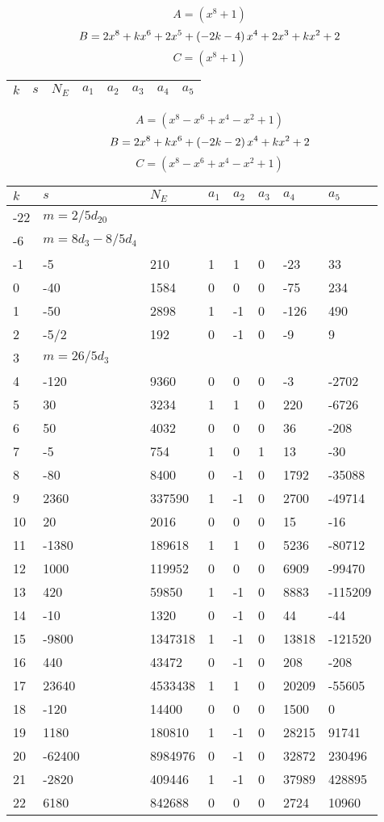 \documentclass{amsart}
\begin{document}
$$A=(x^8
 + 1)$$
$$B=2\*x^8
 + k\*x^6
 + 2\*x^5
 + \left(-2\*k
 - 4\right) \*x^4
 + 2\*x^3
 + k\*x^2
 + 2$$
$$C=(x^8
 + 1)$$
\begin{longtable}{|l|l|l|lllll|}
\hline
$k$ & $s$ & $N_E$ & $a_1$ & $a_2$ & $a_3$ & $a_4$ & $a_5$\\
\hline
\hline
\end{longtable}
$$A=(x^8
 - x^6
 + x^4
 - x^2
 + 1)$$
$$B=2\*x^8
 + k\*x^6
 + \left(-2\*k
 - 2\right) \*x^4
 + k\*x^2
 + 2$$
$$C=(x^8
 - x^6
 + x^4
 - x^2
 + 1)$$
\begin{longtable}{|l|l|l|lllll|}
\hline
$k$ & $s$ & $N_E$ & $a_1$ & $a_2$ & $a_3$ & $a_4$ & $a_5$\\
\hline
-22&$m=2/5d_{20}$&&\multicolumn{5}{c|}{}\\
-6&$m=8d_{3}-8/5d_{4}$&&\multicolumn{5}{c|}{}\\
-1&-5&210&1&1&0&-23&33\\
0&-40&1584&0&0&0&-75&234\\
1&-50&2898&1&-1&0&-126&490\\
2&-5/2&192&0&-1&0&-9&9\\
3&$m=26/5d_{3}$&&\multicolumn{5}{c|}{}\\
4&-120&9360&0&0&0&-3&-2702\\
5&30&3234&1&1&0&220&-6726\\
6&50&4032&0&0&0&36&-208\\
7&-5&754&1&0&1&13&-30\\
8&-80&8400&0&-1&0&1792&-35088\\
9&2360&337590&1&-1&0&2700&-49714\\
10&20&2016&0&0&0&15&-16\\
11&-1380&189618&1&1&0&5236&-80712\\
12&1000&119952&0&0&0&6909&-99470\\
13&420&59850&1&-1&0&8883&-115209\\
14&-10&1320&0&-1&0&44&-44\\
15&-9800&1347318&1&-1&0&13818&-121520\\
16&440&43472&0&-1&0&208&-208\\
17&23640&4533438&1&1&0&20209&-55605\\
18&-120&14400&0&0&0&1500&0\\
19&1180&180810&1&-1&0&28215&91741\\
20&-62400&8984976&0&-1&0&32872&230496\\
21&-2820&409446&1&-1&0&37989&428895\\
22&6180&842688&0&0&0&2724&10960\\

\end{longtable}
\end{document}
